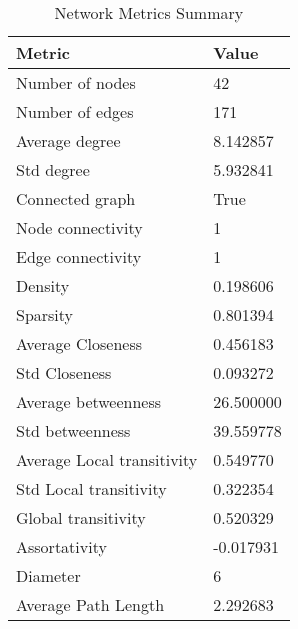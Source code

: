 \begin{table}
\caption{Network Metrics Summary}
\label{tab:Networlmetrics}
\begin{tabular}{ll}
\toprule
Metric & Value \\
\midrule
Number of nodes & 42 \\
Number of edges & 171 \\
Average degree & 8.142857 \\
Std degree & 5.932841 \\
Connected graph & True \\
Node connectivity & 1 \\
Edge connectivity & 1 \\
Density & 0.198606 \\
Sparsity & 0.801394 \\
Average Closeness & 0.456183 \\
Std Closeness & 0.093272 \\
Average betweenness & 26.500000 \\
Std betweenness & 39.559778 \\
Average Local transitivity & 0.549770 \\
Std Local transitivity & 0.322354 \\
Global transitivity & 0.520329 \\
Assortativity & -0.017931 \\
Diameter & 6 \\
Average Path Length & 2.292683 \\
\bottomrule
\end{tabular}
\end{table}
